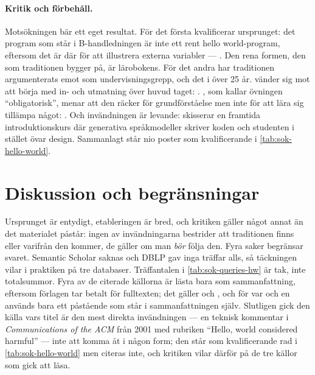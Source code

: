 \paragraph{Kritik och förbehåll.}  Motsökningen bär ett eget resultat.
För det första kvalificerar \textcite{Mount2008Hello} ursprunget: det
program som står i B-handledningen är inte ett rent hello world-program,
eftersom det är där för att illustrera externa variabler ---
.  Den rena formen, den som traditionen bygger på, är lärobokens.
För det andra har traditionen argumenterats emot som undervisningsgrepp,
och det i över 25 år.  \Textcite{RosenbergKolling1996} vänder sig
mot att börja med in- och utmatning över huvud taget:
.  \Textcite{Dodani2003},
som kallar övningen \enquote{obligatorisk}, menar att den räcker för
grundförståelse men inte för att lära sig tillämpa något:
.  Och
invändningen är levande: \textcite{Keuning2024Goodbye} skisserar en
framtida introduktionskurs där generativa språkmodeller skriver koden och
studenten i stället övar design.  Sammanlagt står nio poster som
kvalificerande i \cref{tab:sok-hello-world}.

\section{Diskussion och begränsningar}
\label{sec:hw-diskussion}

Ursprunget är entydigt, etableringen är bred, och kritiken gäller något
annat än det materialet påstår: ingen av invändningarna bestrider att
traditionen finns eller varifrån den kommer, de gäller om man \emph{bör}
följa den.  Fyra saker begränsar svaret.  Semantic Scholar saknas och
DBLP gav inga träffar alls, så täckningen vilar i praktiken på tre
databaser.  Träffantalen i \cref{tab:sok-queries-hw} är tak, inte
totalsummor.  Fyra av de citerade källorna är lästa bara som
sammanfattning, eftersom förlagen tar betalt för fulltexten; det gäller
\textcite{Sack2025Hello,RosenbergKolling1996,Keuning2024Goodbye} och
\textcite{Jeffries2022Hello}, och för var och en används bara ett
påstående som står i sammanfattningen själv.  Slutligen gick den källa
vars titel är den mest direkta invändningen --- en teknisk kommentar i
\emph{Communications of the ACM} från 2001 med rubriken \enquote{Hello,
world considered harmful} --- inte att komma åt i någon form; den står
som kvalificerande rad i \cref{tab:sok-hello-world} men citeras inte, och
kritiken vilar därför på de tre källor som gick att läsa.

